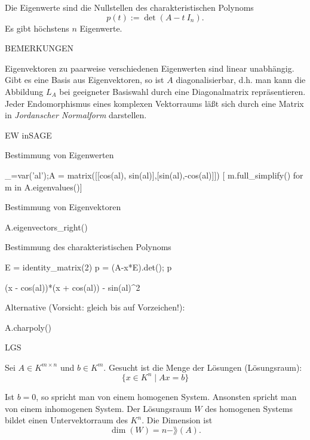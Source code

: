 \documentclass[fontsize=12pt,paper=a4,twoside,bibtotoc,idxtotoc,
liststotoc,pagesize,BCOR1.2cm,DIV15,chapterprefix,pagesize=pdftex]{scrbook}
\theoremstyle{plain}
\theoremstyle{definition}
\theoremstyle{remark}
\begin{document}
 Die Eigenwerte sind die Nullstellen des {\color{red} charakteristischen
Polynoms} 
\[p(t):=\det(A-t \ I_n).\] 
 Es gibt höchstens $n$ Eigenwerte.


BEMERKUNGEN


 Eigenvektoren zu paarweise verschiedenen Eigenwerten  sind linear
unabhängig.
 Gibt es eine Basis aus Eigenvektoren, so ist $A$
{\color{red} diagonalisierbar}, d.h. man kann die Abbildung $L_A$ bei
geeigneter Basiswahl durch eine Diagonalmatrix repräsentieren.
 Jeder Endomorphismus eines komplexen Vektorraums läßt sich durch
eine Matrix in \emph{Jordanscher Normalform} darstellen.


EW inSAGE


 Bestimmung von Eigenwerten
\begin{sagein}
_=var('al');A = matrix([[cos(al), sin(al)],[sin(al),-cos(al)]])
[ m.full_simplify() for m in  A.eigenvalues()]
\end{sagein}
\begin{sage}
  [-1, 1]
\end{sage}
 Bestimmung von Eigenvektoren
\begin{sagein}
A.eigenvectors_right()
\end{sagein}
  Bestimmung des charakteristischen Polynoms
\begin{sagein}
E = identity_matrix(2)
p = (A-x*E).det(); p
\end{sagein}
\begin{sage}
(x - cos(al))*(x + cos(al)) - sin(al)^2
\end{sage}
Alternative (Vorsicht: gleich bis auf Vorzeichen!):
\begin{sagein}
A.charpoly() 
\end{sagein}

\begin{sagein}
[m.full_simplify() for m in solve(p==0,x)]
\end{sagein}
\begin{sage}
  [x == -1, x == 1]
\end{sage}


LGS

Sei $A\in K^{m \times n}$ und $b \in K^m$. Gesucht ist die Menge der
Lösungen (Lösungsraum): 
\[ \{ x \in K^n \;|\; A x = b\} \]

 Ist $b=0$, so spricht man von einem {\color{red} homogenen
System}. Ansonsten spricht man von einem {\color{red} inhomogenen System}.
 Der Lösungsraum $W$ des homogenen Systems bildet einen
Untervektorraum des $K^n$. Die Dimension ist 
\[ \dim (W)=n - \rang(A). \] 
\end{document}
